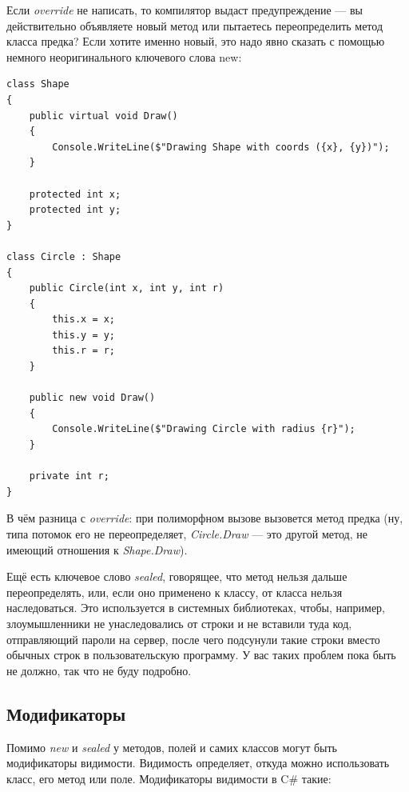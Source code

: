 \documentclass{../../text-style}
\begin{document}
Если \textit{override} не написать, то компилятор выдаст предупреждение --- вы действительно объявляете новый метод или пытаетесь переопределить метод класса предка? Если хотите именно новый, это надо явно сказать с помощью немного неоригинального ключевого слова new:

\begin{verbatim}
class Shape
{
    public virtual void Draw()
    {
        Console.WriteLine($"Drawing Shape with coords ({x}, {y})");
    }

    protected int x;
    protected int y;
}

class Circle : Shape
{
    public Circle(int x, int y, int r)
    {
        this.x = x;
        this.y = y;
        this.r = r;
    }

    public new void Draw()
    {
        Console.WriteLine($"Drawing Circle with radius {r}");
    }

    private int r;
}
\end{verbatim}

В чём разница с \textit{override}: при полиморфном вызове вызовется метод предка (ну, типа потомок его не переопределяет, \textit{Circle.Draw} --- это другой метод, не имеющий отношения к \textit{Shape.Draw}). 

Ещё есть ключевое слово \textit{sealed}, говорящее, что метод нельзя дальше переопределять, или, если оно применено к классу, от класса нельзя наследоваться. Это используется в системных библиотеках, чтобы, например, злоумышленники не унаследовались от строки и не вставили туда код, отправляющий пароли на сервер, после чего подсунули такие строки вместо обычных строк в пользовательскую программу. У вас таких проблем пока быть не должно, так что не буду подробно.

\subsection{Модификаторы}

Помимо \textit{new} и \textit{sealed} у методов, полей и самих классов могут быть модификаторы видимости. Видимость определяет, откуда можно использовать класс, его метод или поле. Модификаторы видимости в C\# такие:
\end{document}
